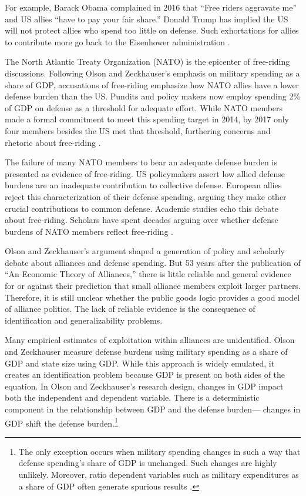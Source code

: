 \documentclass[12pt]{article}
\begin{document}
For example, Barack Obama complained in 2016 that ``Free riders aggravate me'' and US allies ``have to pay your fair share.'' 
Donald Trump has implied the US will not protect allies who spend too little on defense. 
Such exhortations for allies to contribute more go back to the Eisenhower administration \citep{Lanoszka2015}.


The North Atlantic Treaty Organization (NATO) is the epicenter of free-riding discussions. 
Following Olson and Zeckhauser's emphasis on military spending as a share of GDP, accusations of free-riding emphasize how NATO allies have a lower defense burden than the US. 
Pundits and policy makers now employ spending 2\% of GDP on defense as a threshold for adequate effort.
While NATO members made a formal commitment to meet this spending target in 2014, by 2017 only four members besides the US met that threshold, furthering concerns and rhetoric about free-riding \citep{EconomistNATO2017}. 


The failure of many NATO members to bear an adequate defense burden is presented as evidence of free-riding. 
US policymakers assert low allied defense burdens are an inadequate contribution to collective defense. 
European allies reject this characterization of their defense spending, arguing they make other crucial contributions to common defense. 
Academic studies echo this debate about free-riding.  
Scholars have spent decades arguing over whether defense burdens of NATO members reflect free-riding \citep{SandlerForbes1980, Palmer1990, GatesTerasawa1992, SandlerHartley2001, Lanoszka2015, PluemperNeumayer2015}.


Olson and Zeckhauser's argument shaped a generation of policy and scholarly debate about alliances and defense spending. 
But 53 years after the publication of ``An Economic Theory of Alliances,'' there is little reliable and general evidence for or against their prediction that small alliance members exploit larger partners. 
Therefore, it is still unclear whether the public goods logic provides a good model of alliance politics. 
The lack of reliable evidence is the consequence of identification and generalizability problems. 


Many empirical estimates of exploitation within alliances are unidentified.
Olson and Zeckhauser measure defense burdens using military spending as a share of GDP and state size using GDP.
While this approach is widely emulated, it creates an identification problem because GDP is present on both sides of the equation.
In Olson and Zeckhauser's research design, changes in GDP impact both the independent and dependent variable. 
There is a deterministic component in the relationship between GDP and the defense burden--- changes in GDP shift the defense burden.\footnote{
The only exception occurs when military spending changes in such a way that defense spending's share of GDP is unchanged. Such changes are highly unlikely. Moreover, ratio dependent variables such as military expenditures as a share of GDP often generate spurious results \citep{Kronmal1993}.}  
 
\end{document}
